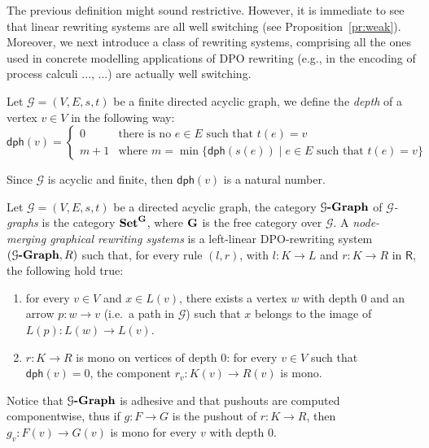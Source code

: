\documentclass[a4paper,UKenglish,cleveref,pdftex,thm-restate,numberwithinsect,anonymous]{lipics}
\newcommand{\gph}[1]{\mathcal{G}\textbf{\textup{-Graph}}}
\newcommand{\dph}{\mathsf{dph}}
\def\R{\mathsf{R}}
\def\G{\textbf {\textup{G}}}
\def\Set{\textbf {\textup{Set}}}
\begin{document}
The previous definition might sound restrictive. However, it is immediate to see that linear rewriting systems are all well switching (see Proposition~\ref{pr:weak}).
%
Moreover, we next introduce a class of rewriting systems, comprising
all the ones used in concrete modelling applications of DPO rewriting
(e.g., in the encoding of process calculi ..., ...) are 
actually well switching.

\begin{definition}
Let $\mathcal{G}=(V, E, s, t)$ be a finite directed acyclic graph, we define the \emph{depth} of a vertex $v\in V$ in the following way:
\[\dph(v)=\begin{cases}
0 & \text{there is no $e\in E$ such that $t(e)=v$}\\
m+1 &\text{where } m=\min\{\dph(s(e)) \mid e\in E \text{ such that } t(e)=v \} 
\end{cases}\]
\end{definition}


\begin{remark}
Since $\mathcal{G}$ is acyclic and finite, then $\dph(v)$ is a natural number.
\end{remark}

\begin{definition}
Let $\mathcal{G}=(V, E, s, t)$ be a directed acyclic graph, the category  $\gph{G}$ of \emph{$\mathcal{G}$-graphs} is the category $\Set^{\G}$, where $\G$ is the free category over $\mathcal{G}$. A \emph{node-merging graphical rewriting systems} is a left-linear DPO-rewriting system $(\gph{G}, \R)$ such that, for every rule $(l,r)$, with $l\colon K\to L$ and $r\colon K\to R$  in $\R$, the following hold true:
\begin{enumerate}
	\item for every $v\in V$ and $x\in L(v)$, there exists a vertex $w$ with depth $0$ and an arrow $p\colon w\to v$ (i.e.~a path in $\mathcal{G}$) such that  $x$ belongs to the image of $L(p)\colon L(w)\to L(v)$.
	\item $r\colon K\to R$ is mono on vertices of depth $0$: for every $v\in V$ such that $\dph(v)=0$, the component $r_v:K(v)\to R(v)$ is mono.
\end{enumerate}
\end{definition}

\begin{remark}\label{rem:po}
	Notice that $\gph{G}$ is adhesive and that pushouts are computed componentwise, thus if $g\colon F\to G$ is the pushout of $r\colon K\to R$, then $g_v\colon F(v)\to G(v)$ is mono for every $v$ with depth $0$.
\end{remark}
\end{document}
